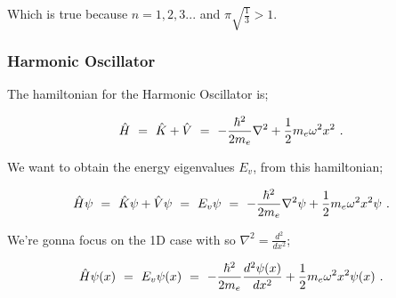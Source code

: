 \documentclass{article}
\begin{document}
Which is true because \begin{math} n = 1, 2, 3... \end{math} and \begin{math} \pi \sqrt{\frac{1}{3}} > 1 \end{math}. 

\subsubsection{Harmonic Oscillator}

The hamiltonian for the Harmonic Oscillator is;

\begin{equation} \label{eq:256}
\hat{H} \hspace{0.125cm} = \hspace{0.125cm} \hat{K} + \hat{V} \hspace{0.125cm} = \hspace{0.125cm} -\frac{\hbar^2}{2 m_e} \nabla^2 + \frac{1}{2} m_e \omega^2 x^2 \hspace{0.125cm} .
\end{equation}

We want to obtain the energy eigenvalues \begin{math} E_v \end{math}, from this hamiltonian;

\begin{equation} \label{eq:256}
\hat{H}\psi \hspace{0.125cm} = \hspace{0.125cm} \hat{K} \psi + \hat{V} \psi \hspace{0.125cm} = \hspace{0.125cm} E_v \psi \hspace{0.125cm} = \hspace{0.125cm} -\frac{\hbar^2}{2 m_e} \nabla^2 \psi + \frac{1}{2} m_e \omega^2 x^2 \psi \hspace{0.125cm} .
\end{equation}

We're gonna focus on the 1D case with so \begin{math} \nabla^2 = \frac{d^2}{dx^2} \end{math};

\begin{equation} \label{eq:256}
\hat{H}\psi(x) \hspace{0.125cm} = \hspace{0.125cm} E_v \psi(x) \hspace{0.125cm} = \hspace{0.125cm} -\frac{\hbar^2}{2 m_e} \frac{d^2 \psi(x)}{dx^2} + \frac{1}{2} m_e \omega^2 x^2 \psi(x) \hspace{0.125cm} .
\end{equation}
\end{document}

